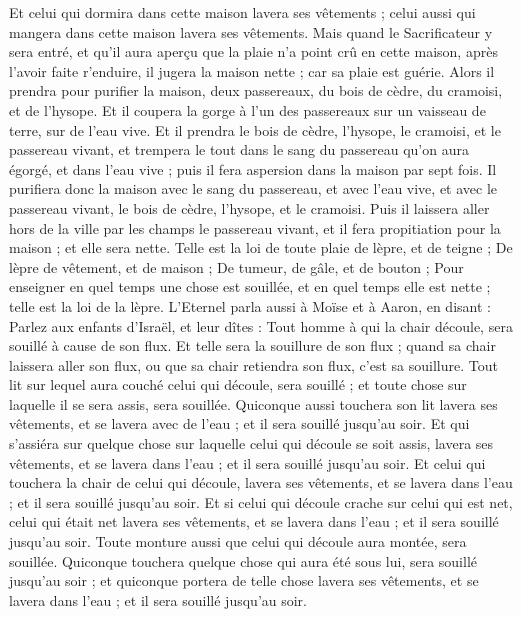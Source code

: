 \begin{multicols}{2}
Et celui qui dormira dans cette maison lavera ses vêtements ; celui aussi qui mangera dans cette maison lavera ses vêtements.
Mais quand le Sacrificateur y sera entré, et qu'il aura aperçu que la plaie n'a point crû en cette maison, après l'avoir faite r'enduire, il jugera la maison nette ; car sa plaie est guérie.
Alors il prendra pour purifier la maison, deux passereaux, du bois de cèdre, du cramoisi, et de l'hysope.
Et il coupera la gorge à l'un des passereaux sur un vaisseau de terre, sur de l'eau vive.
Et il prendra le bois de cèdre, l'hysope, le cramoisi, et le passereau vivant, et trempera le tout dans le sang du passereau qu'on aura égorgé, et dans l'eau vive ; puis il fera aspersion dans la maison par sept fois.
Il purifiera donc la maison avec le sang du passereau, et avec l'eau vive, et avec le passereau vivant, le bois de cèdre, l'hysope, et le cramoisi.
Puis il laissera aller hors de la ville par les champs le passereau vivant, et il fera propitiation pour la maison ; et elle sera nette.
Telle est la loi de toute plaie de lèpre, et de teigne ;
De lèpre de vêtement, et de maison ;
De tumeur, de gâle, et de bouton ;
Pour enseigner en quel temps une chose est souillée, et en quel temps elle est nette ; telle est la loi de la lèpre.
\VerseOne{}L'Eternel parla aussi à Moïse et à Aaron, en disant :
Parlez aux enfants d'Israël, et leur dîtes : Tout homme à qui la chair découle, sera souillé à cause de son flux.
Et telle sera la souillure de son flux ; quand sa chair laissera aller son flux, ou que sa chair retiendra son flux, c'est sa souillure.
Tout lit sur lequel aura couché celui qui découle, sera souillé ; et toute chose sur laquelle il se sera assis, sera souillée.
Quiconque aussi touchera son lit lavera ses vêtements, et se lavera avec de l'eau ; et il sera souillé jusqu'au soir.
Et qui s'assiéra sur quelque chose sur laquelle celui qui découle se soit assis, lavera ses vêtements, et se lavera dans l'eau ; et il sera souillé jusqu'au soir.
Et celui qui touchera la chair de celui qui découle, lavera ses vêtements, et se lavera dans l'eau ; et il sera souillé jusqu'au soir.
Et si celui qui découle crache sur celui qui est net, celui qui était net lavera ses vêtements, et se lavera dans l'eau ; et il sera souillé jusqu'au soir.
Toute monture aussi que celui qui découle aura montée, sera souillée.
Quiconque touchera quelque chose qui aura été sous lui, sera souillé jusqu'au soir ; et quiconque portera de telle chose lavera ses vêtements, et se lavera dans l'eau ; et il sera souillé jusqu'au soir.

\end{multicols}
